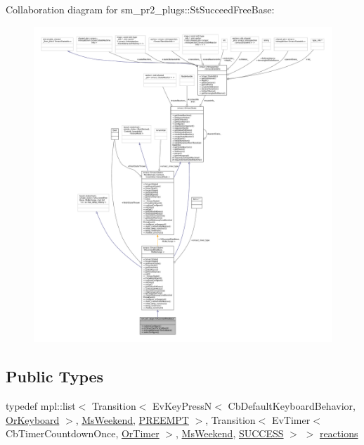 Collaboration diagram for sm\+\_\+pr2\+\_\+plugs\+:\+:St\+Succeed\+Free\+Base\+:
\nopagebreak
\begin{figure}[H]
\begin{center}
\leavevmode
\includegraphics[width=350pt]{structsm__pr2__plugs_1_1StSucceedFreeBase__coll__graph}
\end{center}
\end{figure}
\subsection*{Public Types}
\begin{DoxyCompactItemize}
\item 
typedef mpl\+::list$<$ Transition$<$ Ev\+Key\+PressN$<$ Cb\+Default\+Keyboard\+Behavior, \hyperlink{classsm__pr2__plugs_1_1OrKeyboard}{Or\+Keyboard} $>$, \hyperlink{classsm__pr2__plugs_1_1MsWeekend}{Ms\+Weekend}, \hyperlink{classPREEMPT}{P\+R\+E\+E\+M\+PT} $>$, Transition$<$ Ev\+Timer$<$ Cb\+Timer\+Countdown\+Once, \hyperlink{classsm__pr2__plugs_1_1OrTimer}{Or\+Timer} $>$, \hyperlink{classsm__pr2__plugs_1_1MsWeekend}{Ms\+Weekend}, \hyperlink{classSUCCESS}{S\+U\+C\+C\+E\+SS} $>$ $>$ \hyperlink{structsm__pr2__plugs_1_1StSucceedFreeBase_a4f1039a06354ea339bc40adf26a8b0e6}{reactions}
\end{DoxyCompactItemize}

